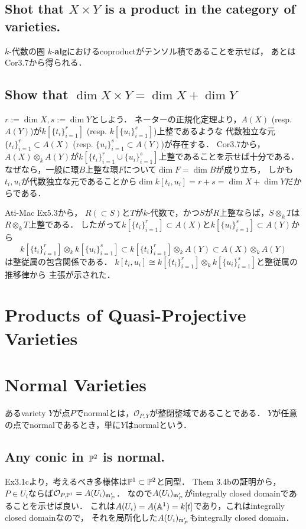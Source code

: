 \documentclass[a4paper]{jsarticle}
\begin{document}
    \subsection{Shot that $X \times Y$ is a product in the category of varieties.}
    $k$-代数の圏 $k$-\textbf{alg}におけるcoproductがテンソル積であることを示せば，
    あとはCor3.7から得られる．

    \subsection{Show that $\dim X \times Y=\dim X+\dim Y$}
    $r:=\dim X, s:=\dim Y$としよう．
    ネーターの正規化定理より，$A(X)$ (resp. $A(Y)$)が$k[\{t_i\}_{i=1}^{r}]$ (resp. $k[\{u_i\}_{i=1}^{s}]$)上整であるような
    代数独立な元$\{t_i\}_{i=1}^{r} \subset A(X)$ (resp. $\{u_i\}_{i=1}^{s} \subset A(Y)$)が存在する．
    Cor3.7から，$A(X) \otimes_k A(Y)$が$k[\{t_i\}_{i=1}^{r} \cup \{u_i\}_{i=1}^{s}]$上整であることを示せば十分である．
    なぜなら，一般に環$B$上整な環$F$について$\dim F=\dim B$が成り立ち，
    しかも$t_i, u_i$が代数独立な元であることから$\dim k[t_i,u_i]=r+s=\dim X+\dim Y$だからである．

    Ati-Mac Ex5.3から，
    $R (\subset S)$と$T$が$k$-代数で，かつ$S$が$R$上整ならば，$S \otimes_k T$は$R \otimes _k T$上整である．
    したがって$k[\{t_i\}_{i=1}^{r}] \subset A(X)$と$k[\{u_i\}_{i=1}^{s}] \subset A(Y)$から
    \[ k[\{t_i\}_{i=1}^{r}] \otimes_k k[\{u_i\}_{i=1}^{s}] \subset k[\{t_i\}_{i=1}^{r}] \otimes_k A(Y) \subset A(X) \otimes_k A(Y) \]
    は整従属の包含関係である．
    $k[t_i,u_i] \cong k[\{t_i\}_{i=1}^{r}] \otimes_k k[\{u_i\}_{i=1}^{s}]$と整従属の推移律から
    主張が示された．

\section{Products of Quasi-Projective Varieties} 

\section{Normal Varieties}
    あるvariety $Y$が点$P$でnormalとは，$\mathcal{O}_{P,Y}$が整閉整域であることである．
    $Y$が任意の点でnormalであるとき，単に$Y$はnormalという．

    \subsection{Any conic in $\mathbb{P}^2$ is normal.}
    Ex3.1cより，考えるべき多様体は$\mathbb{P}^1 \subset \mathbb{P}^2$と同型．
    Them 3.4bの証明から，$P \in U_i$ならば$\mathcal{O}_{P,\mathbb{P}^1}=A(U_i)_{\mathfrak{m}'_P}$．
    なので$A(U_i)_{\mathfrak{m}'_P}$がintegrally closed domainであることを示せば良い．
    これは$A(U_i)=A(\mathbb{A}^1)=k[t]$であり，これはintegrally closed domainなので，
    それを局所化した$A(U_i)_{\mathfrak{m}'_P}$もintegrally closed domain．
\end{document}
